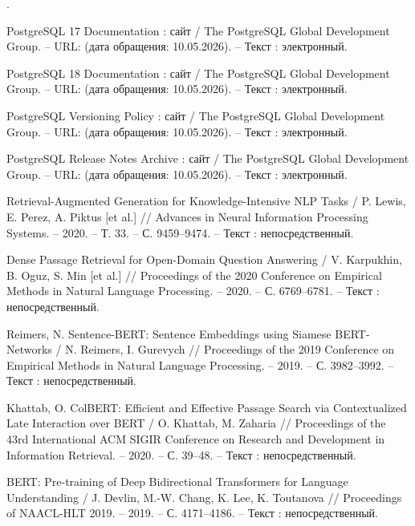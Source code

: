 \begin{list}{.}
\item PostgreSQL 17 Documentation : сайт / The PostgreSQL Global Development Group. – URL:  (дата обращения: 10.05.2026). – Текст : электронный.

\item PostgreSQL 18 Documentation : сайт / The PostgreSQL Global Development Group. – URL:  (дата обращения: 10.05.2026). – Текст : электронный.

\item PostgreSQL Versioning Policy : сайт / The PostgreSQL Global Development Group. – URL:  (дата обращения: 10.05.2026). – Текст : электронный.

\item PostgreSQL Release Notes Archive : сайт / The PostgreSQL Global Development Group. – URL:  (дата обращения: 10.05.2026). – Текст : электронный.

\item Retrieval-Augmented Generation for Knowledge-Intensive NLP Tasks / P. Lewis, E. Perez, A. Piktus [et al.] // Advances in Neural Information Processing Systems. – 2020. – Т. 33. – С. 9459–9474. – Текст : непосредственный.

\item Dense Passage Retrieval for Open-Domain Question Answering / V. Karpukhin, B. Oguz, S. Min [et al.] // Proceedings of the 2020 Conference on Empirical Methods in Natural Language Processing. – 2020. – С. 6769–6781. – Текст : непосредственный.

\item Reimers, N. Sentence-BERT: Sentence Embeddings using Siamese BERT-Networks / N. Reimers, I. Gurevych // Proceedings of the 2019 Conference on Empirical Methods in Natural Language Processing. – 2019. – С. 3982–3992. – Текст : непосредственный.

\item Khattab, O. ColBERT: Efficient and Effective Passage Search via Contextualized Late Interaction over BERT / O. Khattab, M. Zaharia // Proceedings of the 43rd International ACM SIGIR Conference on Research and Development in Information Retrieval. – 2020. – С. 39–48. – Текст : непосредственный.

\item BERT: Pre-training of Deep Bidirectional Transformers for Language Understanding / J. Devlin, M.-W. Chang, K. Lee, K. Toutanova // Proceedings of NAACL-HLT 2019. – 2019. – С. 4171–4186. – Текст : непосредственный.


\end{list}
